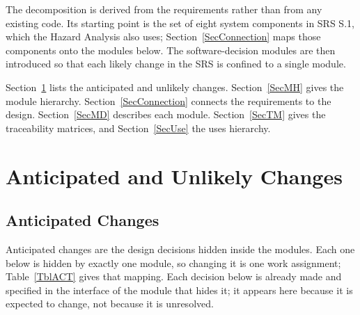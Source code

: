 \documentclass[12pt, titlepage]{article}
\begin{document}
The decomposition is derived from the requirements rather than from any existing
code. Its starting point is the set of eight system components in SRS S.1, which
the Hazard Analysis also uses; Section~\ref{SecConnection} maps those components
onto the modules below. The software-decision modules are then introduced so that
each likely change in the SRS is confined to a single module.

Section~\ref{SecChange} lists the anticipated and unlikely changes.
Section~\ref{SecMH} gives the module hierarchy. Section~\ref{SecConnection}
connects the requirements to the design. Section~\ref{SecMD} describes each
module. Section~\ref{SecTM} gives the traceability matrices, and
Section~\ref{SecUse} the uses hierarchy.

\section{Anticipated and Unlikely Changes} \label{SecChange}

\subsection{Anticipated Changes} \label{SecAchange}

Anticipated changes are the design decisions hidden inside the modules. Each one
below is hidden by exactly one module, so changing it is one work assignment;
Table~\ref{TblACT} gives that mapping. Each decision below is already made
and specified in the interface of the module that hides it; it appears here
because it is expected to change, not because it is unresolved.
\end{document}
